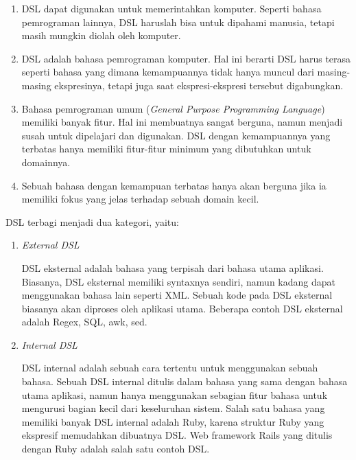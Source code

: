 \begin{enumerate}
      \item DSL dapat digunakan untuk memerintahkan komputer. Seperti bahasa pemrograman lainnya,
            DSL haruslah bisa untuk dipahami manusia, tetapi masih mungkin diolah oleh komputer.

      \item DSL adalah bahasa pemrograman komputer. Hal ini berarti DSL harus terasa seperti
            bahasa yang dimana kemampuannya tidak hanya muncul dari masing-masing ekspresinya,
            tetapi juga saat ekspresi-ekspresi tersebut digabungkan.

      \item Bahasa pemrograman umum (\emph{General Purpose Programming Language}) memiliki banyak fitur.
            Hal ini membuatnya sangat berguna, namun menjadi susah untuk dipelajari dan digunakan.
            DSL dengan kemampuannya yang terbatas hanya memiliki fitur-fitur minimum yang dibutuhkan untuk domainnya.

      \item Sebuah bahasa dengan kemampuan terbatas hanya akan berguna jika ia memiliki
            fokus yang jelas terhadap sebuah domain kecil.
\end{enumerate}

DSL terbagi menjadi dua kategori, yaitu:

\begin{enumerate}
      \item \emph{External DSL}

            DSL eksternal adalah bahasa yang terpisah dari bahasa utama aplikasi.
            Biasanya, DSL eksternal memiliki syntaxnya sendiri, namun kadang dapat menggunakan
            bahasa lain seperti XML. Sebuah kode pada DSL eksternal biasanya akan diproses oleh
            aplikasi utama. Beberapa contoh DSL eksternal adalah Regex, SQL, awk, sed.

      \item \emph{Internal DSL}

            DSL internal adalah sebuah cara tertentu untuk menggunakan sebuah bahasa.
            Sebuah DSL internal ditulis dalam bahasa yang sama dengan bahasa utama aplikasi,
            namun hanya menggunakan sebagian fitur bahasa untuk mengurusi bagian kecil
            dari keseluruhan sistem. Salah satu bahasa yang memiliki banyak DSL internal adalah Ruby,
            karena struktur Ruby yang ekspresif memudahkan dibuatnya DSL.
            Web framework Rails yang ditulis dengan Ruby adalah salah satu contoh DSL.
\end{enumerate}

